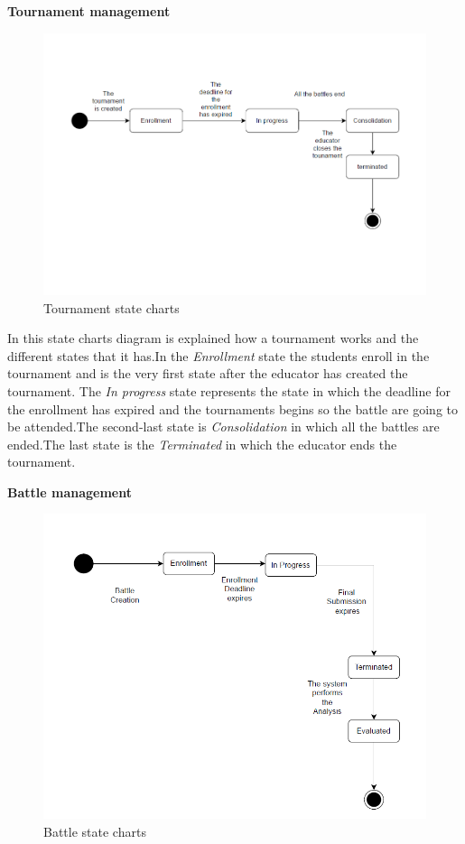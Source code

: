 \textbf{Tournament management}

\begin{figure}[h!]
\centering
\includegraphics[width=12cm]{Images/tournament.png}
\caption{Tournament state charts}
\label{dcd}
\end{figure}



In this state charts diagram is explained how a tournament works and the different states that it has.In the\textit{ Enrollment} state the students enroll in the tournament and is the very first state after the educator has created the tournament.
The \textit{In progress} state represents the state in which the deadline for the enrollment has expired and the tournaments begins so the battle are going to be attended.The second-last state is \textit{Consolidation} in which all the battles are ended.The last state is the \textit{Terminated} in which the educator ends the tournament.

\textbf{Battle management}

\begin{figure}[h!]
\centering
\includegraphics[width=12cm]{Images/startBattle.png}
\caption{Battle state charts}
\label{dcd}
\end{figure}

